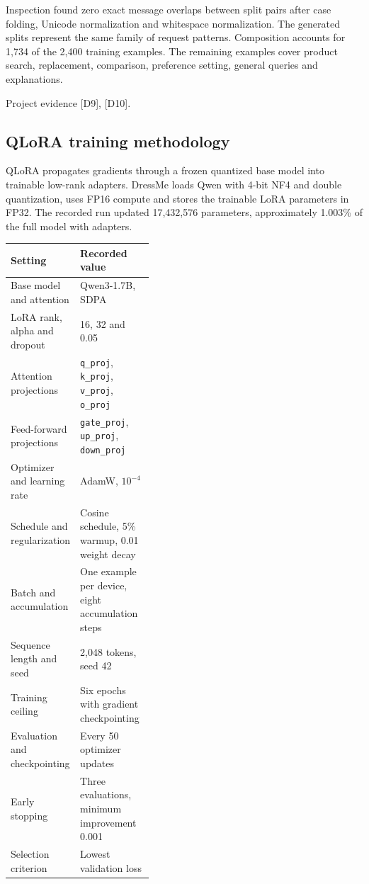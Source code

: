 \documentclass[11pt,a4paper]{article}
\newcommand{\src}[1]{\par{\footnotesize\textcolor{muted}{Project evidence #1.}}\par}
\newcommand{\file}[1]{\nolinkurl{#1}}
\begin{document}
Inspection found zero exact message overlaps between split pairs after case folding, Unicode normalization and whitespace normalization. The generated splits represent the same family of request patterns. Composition accounts for 1,734 of the 2,400 training examples. The remaining examples cover product search, replacement, comparison, preference setting, general queries and explanations.
\src{[D9], [D10]}

\clearpage
\subsection*{QLoRA training methodology}
QLoRA propagates gradients through a frozen quantized base model into trainable low-rank adapters. DressMe loads Qwen with 4-bit NF4 and double quantization, uses FP16 compute and stores the trainable LoRA parameters in FP32. The recorded run updated 17,432,576 parameters, approximately 1.003\% of the full model with adapters. \cite{dettmers2023}

\begin{tabularx}{\linewidth}{@{}L{0.40\linewidth}Y@{}}
\toprule
\textbf{Setting} & \textbf{Recorded value} \\
\midrule
Base model and attention & Qwen3-1.7B, SDPA \\
LoRA rank, alpha and dropout & 16, 32 and 0.05 \\
Attention projections & \file{q_proj}, \file{k_proj}, \file{v_proj}, \file{o_proj} \\
Feed-forward projections & \file{gate_proj}, \file{up_proj}, \file{down_proj} \\
Optimizer and learning rate & AdamW, \(10^{-4}\) \\
Schedule and regularization & Cosine schedule, 5\% warmup, 0.01 weight decay \\
Batch and accumulation & One example per device, eight accumulation steps \\
Sequence length and seed & 2,048 tokens, seed 42 \\
Training ceiling & Six epochs with gradient checkpointing \\
Evaluation and checkpointing & Every 50 optimizer updates \\
Early stopping & Three evaluations, minimum improvement 0.001 \\
Selection criterion & Lowest validation loss \\
\bottomrule
\end{tabularx}
\end{document}

